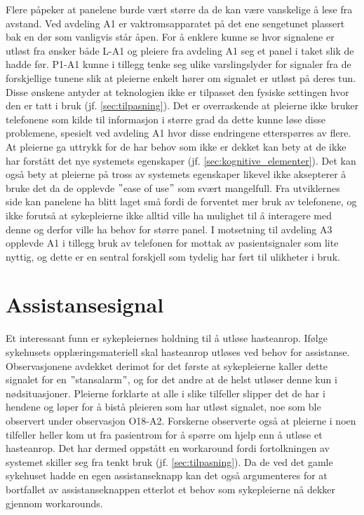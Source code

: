 \noindent
Flere påpeker at panelene burde vært større da de kan være vanskelige å lese fra avstand. Ved avdeling A1 er vaktromsapparatet på det ene sengetunet plassert bak en dør som vanligvis står åpen. For å enklere kunne se hvor signalene er utløst fra ønsker både L-A1 og pleiere fra avdeling A1 seg et panel i taket slik de hadde før. P1-A1 kunne i tillegg tenke seg ulike varslingslyder for signaler fra de forskjellige tunene slik at pleierne enkelt hører om signalet er utløst på deres tun. Disse ønskene antyder at teknologien ikke er tilpasset den fysiske settingen hvor den er tatt i bruk (jf. \ref{sec:tilpasning}). Det er overraskende at pleierne ikke bruker telefonene som kilde til informasjon i større grad da dette kunne løse disse problemene, spesielt ved avdeling A1 hvor disse endringene etterspørres av flere. At pleierne ga uttrykk for de har behov som ikke er dekket kan bety at de ikke har forstått det nye systemets egenskaper (jf. \ref{sec:kognitive_elementer}). Det kan også bety at pleierne på tross av systemets egenskaper likevel ikke aksepterer å bruke det da de opplevde $"$ease of use$"$ som svært mangelfull. Fra utviklernes side kan panelene ha blitt laget små fordi de forventet mer bruk av telefonene, og ikke forutså at sykepleierne ikke alltid ville ha mulighet til å interagere med denne og derfor ville ha behov for større panel. I motsetning til avdeling A3 opplevde  A1 i tillegg bruk av telefonen for mottak av pasientsignaler som lite nyttig, og dette er en sentral forskjell som tydelig har ført til ulikheter i bruk.

\section{Assistansesignal}
Et interessant funn er sykepleiernes holdning til å utløse hasteanrop. Ifølge sykehusets opplæringsmateriell skal hasteanrop utløses ved behov for assistanse. Observasjonene avdekket derimot for det første at sykepleierne kaller dette signalet for en $"$stansalarm$"$, og for det andre at de helst utløser denne kun i nødsituasjoner. Pleierne forklarte at alle i slike tilfeller slipper det de har i hendene og løper for å bistå pleieren som har utløst signalet, noe som ble observert under observasjon O18-A2. Forskerne observerte også at pleierne i noen tilfeller heller kom ut fra pasientrom for å spørre om hjelp enn å utløse et hasteanrop. Det har dermed oppstått en workaround fordi fortolkningen av systemet skiller seg fra tenkt bruk (jf. \ref{sec:tilpasning}). Da de ved det gamle sykehuset hadde en egen assistanseknapp kan det også argumenteres for at bortfallet av assistanseknappen etterlot et behov som sykepleierne nå dekker gjennom workarounds. 

